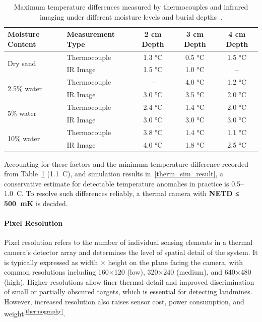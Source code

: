 \begin{table}[H]
    \centering
    \footnotesize
    \renewcommand{\arraystretch}{1}
    \setlength{\tabcolsep}{6pt}
    \caption{Maximum temperature differences measured by thermocouples and infrared imaging under different moisture levels and burial depths~\cite{lamorski2002thermal}.}
    \label{tab:netd_table}
    \begin{tabular}{llccc}
        \toprule
        \textbf{Moisture Content} & \textbf{Measurement Type} & \textbf{2 cm Depth} & \textbf{3 cm Depth} & \textbf{4 cm Depth} \\
        \midrule
        \multirow{2}{*}{Dry sand} 
            & Thermocouple & 1.3 °C & 0.5 °C & 1.5 °C \\
            & IR Image     & 1.5 °C & 1.0 °C & -- \\
        \midrule
        \multirow{2}{*}{2.5\% water} 
            & Thermocouple & --     & 4.0 °C & 1.2 °C \\
            & IR Image     & 3.0 °C & 3.5 °C & 2.0 °C \\
        \midrule
        \multirow{2}{*}{5\% water} 
            & Thermocouple & 2.4 °C & 1.4 °C & 2.0 °C \\
            & IR Image     & 3.0 °C & 3.0 °C & 3.0 °C \\
        \midrule
        \multirow{2}{*}{10\% water} 
            & Thermocouple & 3.8 °C & 1.4 °C & 1.1 °C \\
            & IR Image     & 4.0 °C & 1.8 °C & 2.5 °C \\
        \bottomrule
    \end{tabular}
\end{table}


Accounting for these factors and the minimum temperature difference recorded from Table~\ref{tab:netd_table} (1.1~\textdegree C), and simulation results in~\ref{therm_sim_result}, a conservative estimate for detectable temperature anomalies in practice is 0.5–1.0~\textdegree C. To resolve such differences reliably, a thermal camera with \textbf{NETD ≤ 500~mK} is decided.



\paragraph{Pixel Resolution}

Pixel resolution refers to the number of individual sensing elements in a thermal camera’s detector array and determines the level of spatial detail of the system. It is typically expressed as width × height on the plane facing the camera, with common resolutions including 160×120 (low), 320×240 (medium), and 640×480 (high). Higher resolutions allow finer thermal detail and improved discrimination of small or partially obscured targets, which is essential for detecting landmines. However, increased resolution also raises sensor cost, power consumption, and weight\textsuperscript{\ref{thermography}}.

